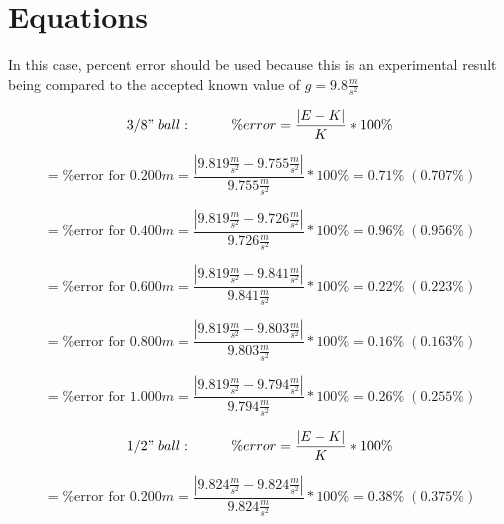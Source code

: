 \chapter{Equations}

In this case, percent error should be used because this is an experimental
result being compared to the accepted known value of $g = 9.8\frac{m}{s^2}$


\begin{equation}
  3/8" \; ball: \hspace{1cm} \%error = \frac{|E - K|}{K} * 100\%
\end{equation}

\begin{equation}
  = \text{\%error for 0.200$m$} = \frac{|9.819\frac{m}{s^2} - 9.755\frac{m}{s^2}|}{9.755\frac{m}{s^2}} * 100\% = 0.71\% \; (0.707\%)
\end{equation}

\begin{equation}
  = \text{\%error for 0.400$m$} = \frac{|9.819\frac{m}{s^2} - 9.726\frac{m}{s^2}|}{9.726\frac{m}{s^2}} * 100\% = 0.96\% \; (0.956\%)
\end{equation}

\begin{equation}
  = \text{\%error for 0.600$m$} = \frac{|9.819\frac{m}{s^2} - 9.841\frac{m}{s^2}|}{9.841\frac{m}{s^2}} * 100\% = 0.22\% \; (0.223\%)
\end{equation}

\begin{equation}
  = \text{\%error for 0.800$m$} = \frac{|9.819\frac{m}{s^2} - 9.803\frac{m}{s^2}|}{9.803\frac{m}{s^2}} * 100\% = 0.16\% \; (0.163\%)
\end{equation}

\begin{equation}
  = \text{\%error for 1.000$m$} = \frac{|9.819\frac{m}{s^2} - 9.794\frac{m}{s^2}|}{9.794\frac{m}{s^2}} * 100\% = 0.26\% \; (0.255\%)
\end{equation}


\begin{equation}
  1/2" \; ball: \hspace{1cm} \%error = \frac{|E - K|}{K} * 100\%
\end{equation}

\begin{equation}
  = \text{\%error for 0.200$m$} = \frac{|9.824\frac{m}{s^2} - 9.824\frac{m}{s^2}|}{9.824\frac{m}{s^2}} * 100\% = 0.38\% \; (0.375\%)
\end{equation}

